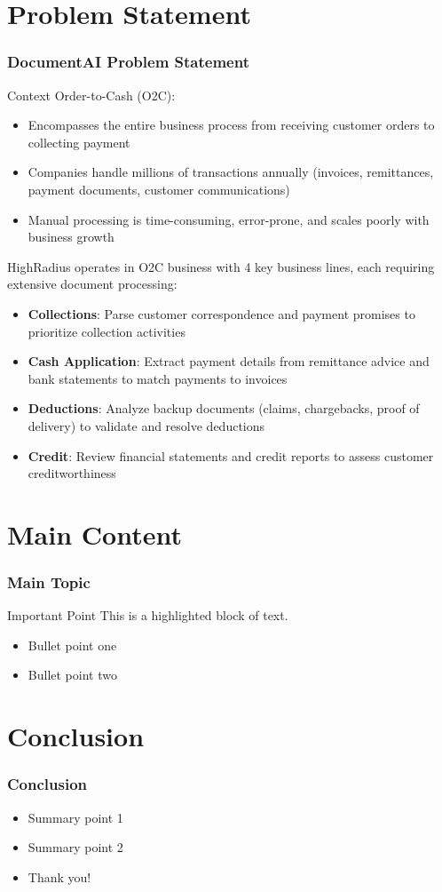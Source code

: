 \documentclass{beamer}
\begin{document}
\section{Problem Statement}

\begin{frame}
\frametitle{DocumentAI Problem Statement}
\begin{block}{Context}
Order-to-Cash (O2C):
\begin{itemize}
    \item Encompasses the entire business process from receiving customer orders to collecting payment
    \item Companies handle millions of transactions annually (invoices, remittances, payment documents, customer communications)
    \item Manual processing is time-consuming, error-prone, and scales poorly with business growth
\end{itemize}

HighRadius operates in O2C business with 4 key business lines, each requiring extensive document processing:
\end{block}

\begin{itemize}
    \item \textbf{Collections}: Parse customer correspondence and payment promises to prioritize collection activities
    \item \textbf{Cash Application}: Extract payment details from remittance advice and bank statements to match payments to invoices
    \item \textbf{Deductions}: Analyze backup documents (claims, chargebacks, proof of delivery) to validate and resolve deductions
    \item \textbf{Credit}: Review financial statements and credit reports to assess customer creditworthiness
\end{itemize}
\end{frame}

\section{Main Content}
\begin{frame}
\frametitle{Main Topic}
\begin{block}{Important Point}
This is a highlighted block of text.
\end{block}

\begin{itemize}
    \item Bullet point one
    \item Bullet point two
\end{itemize}
\end{frame}

\section{Conclusion}
\begin{frame}
\frametitle{Conclusion}
\begin{itemize}
    \item Summary point 1
    \item Summary point 2
    \item Thank you!
\end{itemize}
\end{frame}
\end{document}
